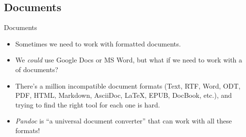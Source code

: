 \subsection{Documents}
\begin{frame}{Documents}
  \begin{itemize}
    \item Sometimes we need to work with formatted documents.
    \pause
    \item We \textit{could} use Google Docs or MS Word, but what if we need
      to work with a  of documents?
    \pause
    \item There's a million incompatible document formats (Text, RTF, Word,
      ODT, PDF, HTML, Markdown, AsciiDoc, \LaTeX, EPUB, DocBook, etc.), and trying to find the right tool for each one is hard.
    \pause
    \item \textit{Pandoc} is \enquote{a universal document converter} that
      can work with all these formats!
  \end{itemize}
\end{frame}

